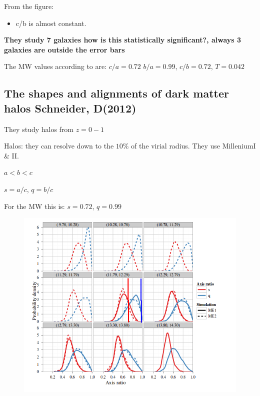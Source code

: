 \documentclass[12pt]{article}
\begin{document}
From the figure:

\begin{itemize}
\item c/b is almost constant. 
\end{itemize}

\textbf{They study 7 galaxies how is this statistically significant?, always 3 galaxies are outside the error bars }

The MW values according to \citep{Law10} are: $c/a = 0.72$ $b/a = 0.99$, $c/b = 0.72$, $T=0.042$

\subsection{The shapes and alignments of dark matter halos Schneider, D(2012)}

They study halos from $z=0-1$

Halos: they can resolve down to the $10\%$ of the virial radius. They use MilleniumI \& II.

$a<b<c$

$s=a/c$, $q=b/c$
  
For the MW this is: $s = 0.72 $, $q = 0.99 $


\begin{figure}[H]
\centering
\includegraphics[scale=0.5]{distribution.png}
\end{figure}
\end{document}
